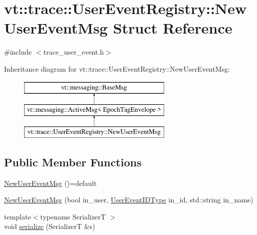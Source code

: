 \hypertarget{structvt_1_1trace_1_1_user_event_registry_1_1_new_user_event_msg}{}\section{vt\+:\+:trace\+:\+:User\+Event\+Registry\+:\+:New\+User\+Event\+Msg Struct Reference}
\label{structvt_1_1trace_1_1_user_event_registry_1_1_new_user_event_msg}


{\ttfamily \#include $<$trace\+\_\+user\+\_\+event.\+h$>$}

Inheritance diagram for vt\+:\+:trace\+:\+:User\+Event\+Registry\+:\+:New\+User\+Event\+Msg\+:\begin{figure}[H]
\begin{center}
\leavevmode
\includegraphics[height=3.000000cm]{structvt_1_1trace_1_1_user_event_registry_1_1_new_user_event_msg}
\end{center}
\end{figure}
\subsection*{Public Member Functions}
\begin{DoxyCompactItemize}
\item 
\hyperlink{structvt_1_1trace_1_1_user_event_registry_1_1_new_user_event_msg_a971f584b592c65f34216ce228eeb9d9a}{New\+User\+Event\+Msg} ()=default
\item 
\hyperlink{structvt_1_1trace_1_1_user_event_registry_1_1_new_user_event_msg_aaf57bf569ab47f0526956ab05478668f}{New\+User\+Event\+Msg} (bool in\+\_\+user, \hyperlink{namespacevt_1_1trace_a5908920d051c144c89f17c69ed262350}{User\+Event\+I\+D\+Type} in\+\_\+id, std\+::string in\+\_\+name)
\item 
{\footnotesize template$<$typename SerializerT $>$ }\\void \hyperlink{structvt_1_1trace_1_1_user_event_registry_1_1_new_user_event_msg_a3c95e7e198bfff9a4ac61e31f0863986}{serialize} (SerializerT \&s)
\end{DoxyCompactItemize}
